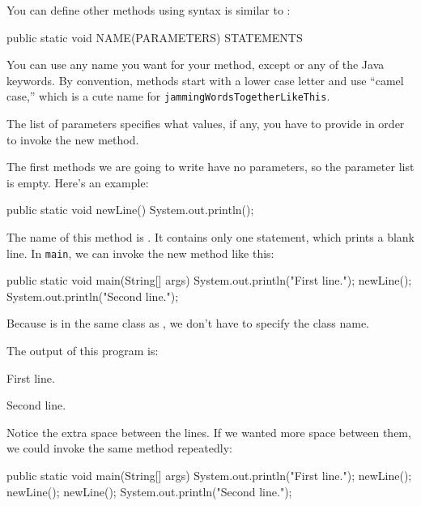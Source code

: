 You can define other methods using syntax is similar to :

\begin{code}
    public static void NAME(PARAMETERS) {
        STATEMENTS
    }
\end{code}

You can use any name you want for your method, except  or any of the Java keywords.
By convention, methods start with a lower case letter and use ``camel case,'' which is a cute name for {\tt jammingWordsTogetherLikeThis}.

The list of parameters specifies what values, if any, you have to provide in order to invoke the new method.


The first methods we are going to write have no parameters, so the parameter list is empty.  Here's an example:

\begin{code}
    public static void newLine() {
        System.out.println();
    }
\end{code}

The name of this method is .  It 
contains only one statement, which prints a blank line.
In {\tt main}, we can invoke the new method like this:

\begin{code}
    public static void main(String[] args) {
        System.out.println("First line.");
        newLine();
        System.out.println("Second line.");
    }
\end{code}

Because  is in the same class as , we don't have to specify the class name.

The output of this program is:

\begin{stdout}
First line.

Second line.
\end{stdout}

Notice the extra space between the lines.
If we wanted more space between them, we could invoke the same method repeatedly:

\begin{code}
    public static void main(String[] args) {
        System.out.println("First line.");
        newLine();
        newLine();
        newLine();
        System.out.println("Second line.");
    }
\end{code}


